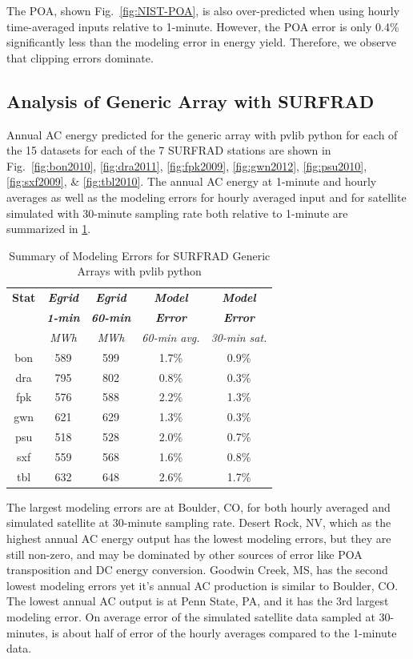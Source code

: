 \documentclass[conference]{IEEEtran}
\begin{document}
The POA, shown Fig.~\ref{fig:NIST-POA}, is also over-predicted when using hourly time-averaged inputs relative to 1-minute. However, the POA error is only 0.4\% significantly less than the modeling error in energy yield. Therefore, we observe that clipping errors dominate.

\subsection{Analysis of Generic Array with SURFRAD}
Annual AC energy predicted for the generic array with pvlib python for each of the 15 datasets for each of the 7 SURFRAD stations are shown in Fig.~\ref{fig:bon2010}, \ref{fig:dra2011}, \ref{fig:fpk2009}, \ref{fig:gwn2012}, \ref{fig:psu2010}, \ref{fig:sxf2009}, \& \ref{fig:tbl2010}. The annual AC energy at 1-minute and hourly averages as well as the modeling errors for hourly averaged input and for satellite simulated with 30-minute sampling rate both relative to 1-minute are summarized in \ref{table:SURFRAD-summary}.

\begin{table}[htbp]
\caption{Summary of Modeling Errors for SURFRAD Generic Arrays with pvlib python}
\begin{center}
\begin{tabular}{|c|c|c|c|c|}
\hline
\textbf{Stat} & \textbf{\textit{Egrid}}& \textbf{\textit{Egrid}}& \textbf{\textit{Model}}& \textbf{\textit{Model}} \\
              & \textbf{\textit{1-min}}& \textbf{\textit{60-min}}& \textbf{\textit{Error}}& \textbf{\textit{Error}} \\
                 & \textit{MWh}& \textit{MWh}& \textit{60-min avg.}& \textit{30-min sat.} \\
\hline
bon& 589& 599& 1.7\%& 0.9\% \\
dra& 795& 802& 0.8\%& 0.3\% \\
fpk& 576& 588& 2.2\%& 1.3\% \\
gwn& 621& 629& 1.3\%& 0.3\% \\
psu& 518& 528& 2.0\%& 0.7\% \\
sxf& 559& 568& 1.6\%& 0.8\% \\
tbl& 632& 648& 2.6\%& 1.7\% \\
\hline
\end{tabular}
\label{table:SURFRAD-summary}
\end{center}
\end{table}

The largest modeling errors are at Boulder, CO, for both hourly averaged and simulated satellite at 30-minute sampling rate. Desert Rock, NV, which as the highest annual AC energy output has the lowest modeling errors, but they are still non-zero, and may be dominated by other sources of error like POA transposition and DC energy conversion. Goodwin Creek, MS, has the second lowest modeling errors yet it's annual AC production is similar to Boulder, CO. The lowest annual AC output is at Penn State, PA, and it has the 3rd largest modeling error. On average error of the simulated satellite data sampled at 30-minutes, is about half of error of the hourly averages compared to the 1-minute data.
\end{document}
